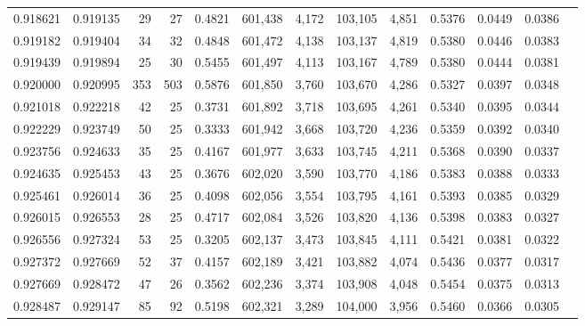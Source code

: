 \begin{tabular}{rrrrrrrrrrrrr}
0.918621 & 0.919135 &    29 &  27 &                                     0.4821 & 601,438 &   4,172 & 103,105 &   4,851 & 0.5376 & 0.0449 & 0.0386 \\
0.919182 & 0.919404 &    34 &  32 &                                     0.4848 & 601,472 &   4,138 & 103,137 &   4,819 & 0.5380 & 0.0446 & 0.0383 \\
0.919439 & 0.919894 &    25 &  30 &                                     0.5455 & 601,497 &   4,113 & 103,167 &   4,789 & 0.5380 & 0.0444 & 0.0381 \\
0.920000 & 0.920995 &   353 & 503 &                                     0.5876 & 601,850 &   3,760 & 103,670 &   4,286 & 0.5327 & 0.0397 & 0.0348 \\
0.921018 & 0.922218 &    42 &  25 &                                     0.3731 & 601,892 &   3,718 & 103,695 &   4,261 & 0.5340 & 0.0395 & 0.0344 \\
0.922229 & 0.923749 &    50 &  25 &                                     0.3333 & 601,942 &   3,668 & 103,720 &   4,236 & 0.5359 & 0.0392 & 0.0340 \\
0.923756 & 0.924633 &    35 &  25 &                                     0.4167 & 601,977 &   3,633 & 103,745 &   4,211 & 0.5368 & 0.0390 & 0.0337 \\
0.924635 & 0.925453 &    43 &  25 &                                     0.3676 & 602,020 &   3,590 & 103,770 &   4,186 & 0.5383 & 0.0388 & 0.0333 \\
0.925461 & 0.926014 &    36 &  25 &                                     0.4098 & 602,056 &   3,554 & 103,795 &   4,161 & 0.5393 & 0.0385 & 0.0329 \\
0.926015 & 0.926553 &    28 &  25 &                                     0.4717 & 602,084 &   3,526 & 103,820 &   4,136 & 0.5398 & 0.0383 & 0.0327 \\
0.926556 & 0.927324 &    53 &  25 &                                     0.3205 & 602,137 &   3,473 & 103,845 &   4,111 & 0.5421 & 0.0381 & 0.0322 \\
0.927372 & 0.927669 &    52 &  37 &                                     0.4157 & 602,189 &   3,421 & 103,882 &   4,074 & 0.5436 & 0.0377 & 0.0317 \\
0.927669 & 0.928472 &    47 &  26 &                                     0.3562 & 602,236 &   3,374 & 103,908 &   4,048 & 0.5454 & 0.0375 & 0.0313 \\
0.928487 & 0.929147 &    85 &  92 &                                     0.5198 & 602,321 &   3,289 & 104,000 &   3,956 & 0.5460 & 0.0366 & 0.0305 \\

\end{tabular}
